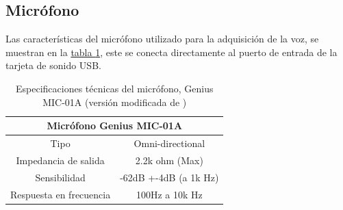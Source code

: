 \documentclass[11pt,lettersize]{article} %
\newcommand{\tabla}[1]{\hyperref[{#1}]{tabla \ref*{#1}}}
\begin{document}
\subsection{Micrófono}
Las características del micrófono utilizado para la adquisición de la voz, se muestran en la \tabla{T-mic}, este se conecta directamente al puerto de entrada de la tarjeta de sonido USB.
\begin{table}[H]
	\begin{center}
		\begin{tabular}{|c|c|}
			\hline
			\multicolumn{2}{|c|}{Micrófono Genius MIC-01A}\\ \hline
			Tipo & Omni-directional\\ \hline
			Impedancia de salida & 2.2k ohm (Max)\\ \hline
			Sensibilidad & -62dB +-4dB (a 1k Hz)\\ \hline
			Respuesta en frecuencia & 100Hz a 10k Hz\\ \hline
		\end{tabular}
	\end{center}
	\caption[Especificaciones técnicas del micrófono MIC-01A]{Especificaciones técnicas del micrófono, Genius MIC-01A (versión modificada de \cite{Genius2009})}
	\label{T-mic}
\end{table}
 
\end{document}
